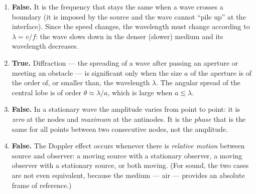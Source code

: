\documentclass[11pt]{article}
\newcommand{\cle}[1]{{\popxbold\color{popdark}#1}}
\begin{document}
\begin{corrige}
\begin{enumerate}
\item \textbf{False.} It is the \cle{frequency} that stays the same when a wave crosses a boundary (it is imposed by the source and the wave cannot ``pile up'' at the interface). Since the speed changes, the wavelength must change according to $\lambda = v/f$: the wave slows down in the denser (slower) medium and its wavelength decreases.
\item \textbf{True.} Diffraction --- the spreading of a wave after passing an aperture or meeting an obstacle --- is significant only when the size $a$ of the aperture is of the order of, or smaller than, the wavelength $\lambda$. The angular spread of the central lobe is of order $\theta \approx \lambda/a$, which is large when $a \lesssim \lambda$.
\item \textbf{False.} In a stationary wave the amplitude varies from point to point: it is \emph{zero} at the \cle{nodes} and \emph{maximum} at the \cle{antinodes}. It is the \emph{phase} that is the same for all points between two consecutive nodes, not the amplitude.
\item \textbf{False.} The Doppler effect occurs whenever there is \emph{relative motion} between source and observer: a moving source with a stationary observer, a moving observer with a stationary source, or both moving. (For sound, the two cases are not even equivalent, because the medium --- air --- provides an absolute frame of reference.)
\end{enumerate}
\end{corrige}
\end{document}
